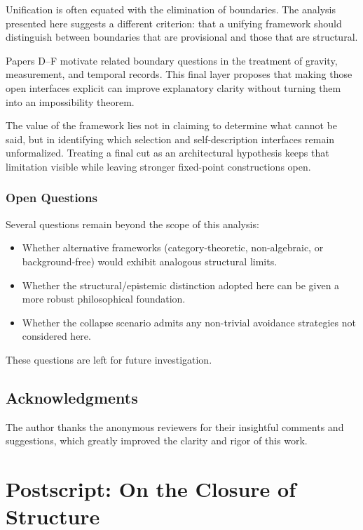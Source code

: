 \documentclass[12pt,a4paper,openany]{book}
\begin{document}
Unification is often equated with the elimination of boundaries. The analysis presented here suggests a different criterion: that a unifying framework should distinguish between boundaries that are provisional and those that are structural.

Papers D--F motivate related boundary questions in the treatment of gravity, measurement, and temporal records. This final layer proposes that making those open interfaces explicit can improve explanatory clarity without turning them into an impossibility theorem.

The value of the framework lies not in claiming to determine what cannot be said, but in identifying which selection and self-description interfaces remain unformalized. Treating a final cut as an architectural hypothesis keeps that limitation visible while leaving stronger fixed-point constructions open.

\subsection{Open Questions}

Several questions remain beyond the scope of this analysis:

\begin{itemize}
    \item Whether alternative frameworks (category-theoretic, non-algebraic, or background-free) would exhibit analogous structural limits.
    \item Whether the structural/epistemic distinction adopted here can be given a more robust philosophical foundation.
    \item Whether the collapse scenario admits any non-trivial avoidance strategies not considered here.
\end{itemize}

These questions are left for future investigation.

\section*{Acknowledgments}

The author thanks the anonymous reviewers for their insightful comments and suggestions, which greatly improved the clarity and rigor of this work.

\chapter{Postscript: On the Closure of Structure}
\label{chap:postscript}
\end{document}
